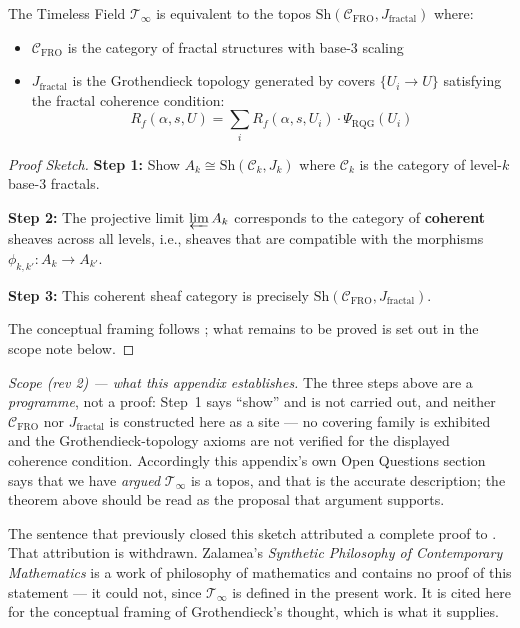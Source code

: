 \begin{theorem}
\label{thm:timeless_topos}
The Timeless Field $\mathcal{T}_\infty$ is equivalent to the topos $\text{Sh}(\mathcal{C}_{\text{FRO}}, J_{\text{fractal}})$ where:
\begin{itemize}
\item $\mathcal{C}_{\text{FRO}}$ is the category of fractal structures with base-3 scaling
\item $J_{\text{fractal}}$ is the Grothendieck topology generated by covers $\{U_i \to U\}$ satisfying the fractal coherence condition:
\begin{equation}
R_f(\alpha, s, U) = \sum_i R_f(\alpha, s, U_i) \cdot \Psi_{\text{RQG}}(U_i)
\end{equation}
\end{itemize}
\end{theorem}

\begin{proof}[Proof Sketch]
\textbf{Step 1:} Show $A_k \cong \text{Sh}(\mathcal{C}_k, J_k)$ where $\mathcal{C}_k$ is the category of level-$k$ base-3 fractals.

\textbf{Step 2:} The projective limit $\varprojlim A_k$ corresponds to the category of \textbf{coherent} sheaves across all levels, i.e., sheaves that are compatible with the morphisms $\phi_{k,k'}: A_k \to A_{k'}$.

\textbf{Step 3:} This coherent sheaf category is precisely $\text{Sh}(\mathcal{C}_{\text{FRO}}, J_{\text{fractal}})$.

The conceptual framing follows \cite{zalamea2012}; what remains to be proved is set out in the scope note below.
\end{proof}

\emph{Scope (rev 2) --- what this appendix establishes.} The three steps above
are a \emph{programme}, not a proof: Step~1 says ``show'' and is not carried
out, and neither $\mathcal{C}_{\text{FRO}}$ nor $J_{\text{fractal}}$ is
constructed here as a site --- no covering family is exhibited and the
Grothendieck-topology axioms are not verified for the displayed coherence
condition. Accordingly this appendix's own Open Questions section says that we
have \emph{argued} $\mathcal{T}_\infty$ is a topos, and that is the accurate
description; the theorem above should be read as the proposal that argument
supports.

The sentence that previously closed this sketch attributed a complete proof to
\cite{zalamea2012}. That attribution is withdrawn. Zalamea's
\emph{Synthetic Philosophy of Contemporary Mathematics} is a work of philosophy
of mathematics and contains no proof of this statement --- it could not, since
$\mathcal{T}_\infty$ is defined in the present work. It is cited here for the
conceptual framing of Grothendieck's thought, which is what it supplies.

